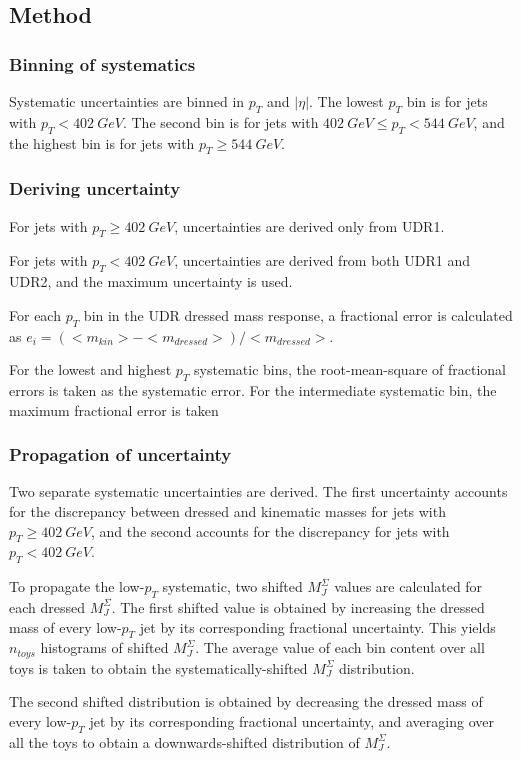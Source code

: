 \subsection{Method}

\subsubsection{Binning of systematics}
Systematic uncertainties are binned in $p_{T}$ and $|\eta|$. The lowest
$p_{T}$ bin is for jets with $p_{T} < 402~GeV$. The second bin is for
jets with $402~GeV \leq p_T
< 544~GeV$, and the highest bin is for jets with $p_T \geq 544~GeV$.

\subsubsection{Deriving uncertainty}
For jets with $p_{T} \geq 402~GeV$, uncertainties are derived only
from UDR1.

For jets with $p_{T} < 402~GeV$, uncertainties are derived from both
UDR1 and UDR2, and the maximum uncertainty is used.

For each $p_T$ bin in the UDR dressed mass response, a fractional
error is calculated as
$e_i=\left(<m_{kin}>-<m_{dressed}>\right)/<m_{dressed}>$.

For the lowest and highest $p_T$ systematic bins, the root-mean-square
of fractional errors is taken as the systematic error. For the
intermediate systematic bin, the maximum fractional error is taken

\subsubsection{Propagation of uncertainty}
Two separate systematic uncertainties are derived. The first
uncertainty accounts for the discrepancy between dressed and kinematic
masses for jets with $p_T \geq 402~GeV$, and the second accounts for the
discrepancy for jets with $p_T < 402~GeV$.

To propagate the low-$p_T$ systematic, two shifted $M_{J}^{\Sigma}$
values are calculated for each dressed $M_{J}^{\Sigma}$. The first
shifted value is obtained by increasing the dressed mass of every
low-$p_T$ jet by its corresponding fractional uncertainty. This yields
$n_{toys}$ histograms of shifted $M_{J}^{\Sigma}$. The average value
of each bin content over all toys is taken to obtain the
systematically-shifted $M_{J}^{\Sigma}$ distribution. 

The second
shifted distribution is obtained by decreasing the dressed mass of every
low-$p_T$ jet by its corresponding fractional uncertainty, and
averaging over all the toys to obtain a downwards-shifted distribution
of $M_{J}^{\Sigma}$. 

